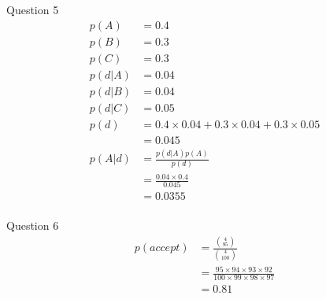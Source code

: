 \documentclass{article}
\begin{document}
	Question 5
	\begin{align}
		p(A) & = 0.4 \nonumber \\
		p(B) & = 0.3 \nonumber \\
		p(C) & = 0.3 \nonumber \\
		p(d \vert A) & = 0.04  \nonumber \\
		p(d \vert B) & = 0.04  \nonumber \\
		p(d \vert C) & = 0.05  \nonumber \\
		p(d) & = 0.4\times0.04 + 0.3 \times 0.04 + 0.3 \times 0.05  \nonumber \\
		& = 0.045\nonumber\\
		p(A \vert d) & =\frac{p(d \vert A)p(A)}{ p(d)}  \nonumber \\
		& = \frac{0.04\times 0.4}{0.045}  \nonumber \\
		& = 0.0355  \nonumber \\
	\end{align}

	Question 6
	\begin{align}
		p(accept) & = \frac{{4 \choose 95}}{{4 \choose 100}} \nonumber \\
		& = \frac{95\times94\times 93\times 92}{100\times99\times 98\times 97}  \nonumber \\
		& = 0.81  \nonumber \\
	\end{align}
\end{document}
